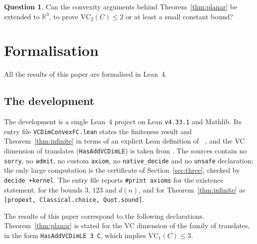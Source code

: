 \documentclass[11pt,a4paper]{article}
\theoremstyle{plain}
\theoremstyle{definition}
\newtheorem{question}[theorem]{Question}
\DeclareMathOperator{\VCn}{\mathrm{VC}_n}
\newcommand{\R}{\mathbb{R}}
\newcommand{\lean}[1]{\texttt{\footnotesize #1}}
\begin{document}
\begin{question}
Can the convexity arguments behind Theorem~\ref{thm:planar} be extended to $\R^{3}$, to prove
$\mathrm{VC}_2(C)\le2$ or at least a small constant bound?
\end{question}

\section{Formalisation}\label{sec:formal}

All the results of this paper are formalised in Lean~4.

\subsection{The development}

The development \cite{repo} is a single Lean~4 project on Lean \lean{v4.33.1} and Mathlib. Its
entry file \lean{VCDimConvexFC.lean} states the finiteness result and
Theorem~\ref{thm:infinite} in terms of an explicit Lean definition of $\VCn$, and
the VC dimension of translates (\lean{HasAddVCDimLE}) is taken from \cite{meanfourier}. The
sources contain no \lean{sorry}, no \lean{admit}, no custom \lean{axiom}, no
\lean{native\_decide} and no \lean{unsafe} declaration; the only large computation is the
certificate of Section~\ref{sec:three}, checked by \lean{decide~+kernel}. The entry file reports
\lean{\#print axioms} for the existence statement, for the bounds $3$, $123$ and $d(n)$, and for
Theorem~\ref{thm:infinite} as
\lean{[propext, Classical.choice, Quot.sound]}.

The results of this paper correspond to the following declarations. Theorem~\ref{thm:planar} is
stated for the VC dimension of the family of translates, in the form \lean{HasAddVCDimLE 3 C},
which implies $\mathrm{VC}_1(C)\le3$.
\end{document}
